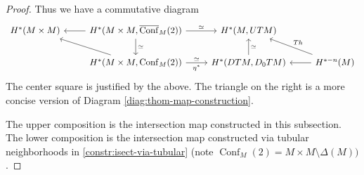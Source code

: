\documentclass{scrartcl}
\theoremstyle{plain}
\theoremstyle{definition}
\newcommand{\capp}{\mathbin{\frown}}
\newcommand{\iso}{\cong}
\newcommand{\quiso}{\simeq}
\DeclareMathOperator{\Conf}{Conf}
\DeclareMathOperator{\cConf}{\overline{Conf}}
\begin{document}
\begin{proof}
    Thus we have a commutative diagram
    \[\begin{tikzcd}
        H^*(M\times M)  & \dar["\quiso"] \lar H^*(M\times M, \cConf_M(2)) \rar["\quiso"] &   H^*(M, UTM) &\\
        & \ar[ul] H^*(M\times M, \Conf_M(2))  \rar{\quiso}[swap]{\eta^*} & \uar[swap, "\quiso"]  H^*(DTM, D_0TM) & \lar H^{*-n}(M) \ar{lu}[swap]{Th}
    \end{tikzcd}\]
    The center square is justified by the above. The triangle on the right is a more concise version of Diagram \ref{diag:thom-map-construction}.

    The upper composition is the intersection map constructed in this subsection. The lower composition is the intersection map constructed via tubular neighborhoods in \cref{constr:isect-via-tubular} (note $\Conf_M(2) = M\times M\setminus\Delta(M))$.
\end{proof}


    

    
\end{document}
